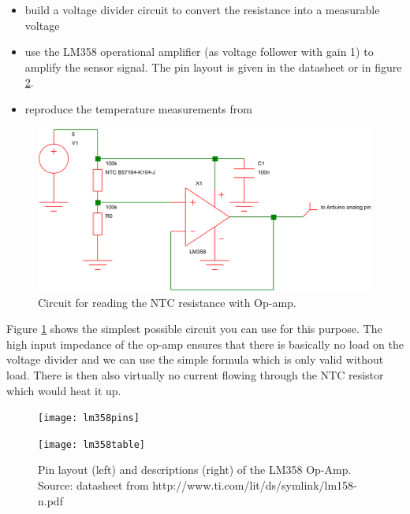 \begin{itemize}
	\item build a voltage divider circuit to convert the resistance into a measurable voltage
	\item use the LM358 operational amplifier (as voltage follower with gain 1) to amplify the sensor signal. The pin layout is given in the datasheet or in figure \ref{fig:tempcircuit2}.
	\item reproduce the temperature measurements from 
\end{itemize}

\begin{figure}[H]
\begin{center}
\includegraphics[width=14cm]{ntc_opamp_schematic}
\caption{Circuit for reading the NTC resistance with Op-amp.}\label{fig:tempcircuit}
\end{center}
\end{figure}

Figure \ref{fig:tempcircuit} shows the simplest possible circuit you can use for this purpose. The high input impedance of the op-amp ensures that there is basically no load on the voltage divider and we can use the simple formula which is only valid without load. There is then also virtually no current flowing through the NTC resistor which would heat it up.


\begin{figure}[H]
\begin{center}
  \centering
  \begin{minipage}[b]{0.4\textwidth}
    \texttt{[image: lm358pins]}
  \end{minipage}
  \hfill
  \begin{minipage}[b]{0.5\textwidth}
    \texttt{[image: lm358table]}
  \end{minipage}
\caption{Pin layout (left) and descriptions (right) of the LM358 Op-Amp. Source: datasheet from http://www.ti.com/lit/ds/symlink/lm158-n.pdf}\label{fig:tempcircuit2}
\end{center}
\end{figure}


